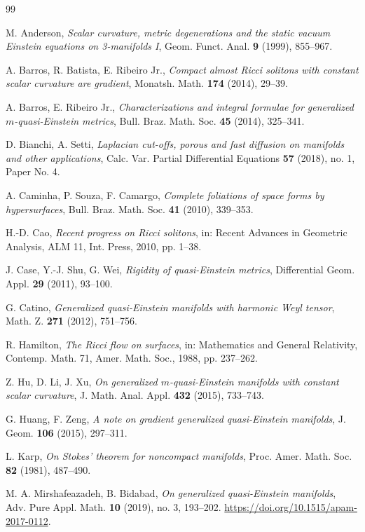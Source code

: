 \documentclass[12pt,a4paper]{article}
\theoremstyle{definition}
\theoremstyle{definition}
\begin{document}
\begin{thebibliography}{99}

 M. Anderson, \textit{Scalar curvature, metric degenerations and the static vacuum Einstein equations on 3-manifolds I}, Geom. Funct. Anal. \textbf{9} (1999), 855--967.

 A. Barros, R. Batista, E. Ribeiro Jr., \textit{Compact almost Ricci solitons with constant scalar curvature are gradient}, Monatsh. Math. \textbf{174} (2014), 29--39.

 A. Barros, E. Ribeiro Jr., \textit{Characterizations and integral formulae for generalized $m$-quasi-Einstein metrics}, Bull. Braz. Math. Soc. \textbf{45} (2014), 325--341.

 D. Bianchi, A. Setti, \textit{Laplacian cut-offs, porous and fast diffusion on manifolds and other applications}, Calc. Var. Partial Differential Equations \textbf{57} (2018), no. 1, Paper No. 4.

 A. Caminha, P. Souza, F. Camargo, \textit{Complete foliations of space forms by hypersurfaces}, Bull. Braz. Math. Soc. \textbf{41} (2010), 339--353.

 H.-D. Cao, \textit{Recent progress on Ricci solitons}, in: Recent Advances in Geometric Analysis, ALM 11, Int. Press, 2010, pp. 1--38.

 J. Case, Y.-J. Shu, G. Wei, \textit{Rigidity of quasi-Einstein metrics}, Differential Geom. Appl. \textbf{29} (2011), 93--100.

 G. Catino, \textit{Generalized quasi-Einstein manifolds with harmonic Weyl tensor}, Math. Z. \textbf{271} (2012), 751--756.

 R. Hamilton, \textit{The Ricci flow on surfaces}, in: Mathematics and General Relativity, Contemp. Math. 71, Amer. Math. Soc., 1988, pp. 237--262.

 Z. Hu, D. Li, J. Xu, \textit{On generalized $m$-quasi-Einstein manifolds with constant scalar curvature}, J. Math. Anal. Appl. \textbf{432} (2015), 733--743.

 G. Huang, F. Zeng, \textit{A note on gradient generalized quasi-Einstein manifolds}, J. Geom. \textbf{106} (2015), 297--311.

 L. Karp, \textit{On Stokes' theorem for noncompact manifolds}, Proc. Amer. Math. Soc. \textbf{82} (1981), 487--490.

 M. A. Mirshafeazadeh, B. Bidabad, \textit{On generalized quasi-Einstein manifolds}, Adv. Pure Appl. Math. \textbf{10} (2019), no. 3, 193--202. \url{https://doi.org/10.1515/apam-2017-0112}.


\end{thebibliography}
\end{document}
